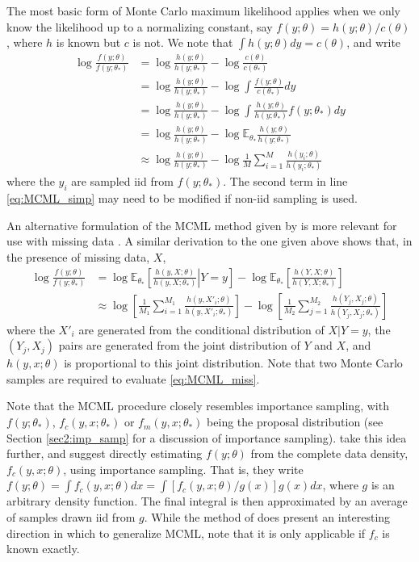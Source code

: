 \documentclass[11pt, oneside]{article}   	%
\newcommand{\bE}{\mathbb{E}}
\begin{document}
The most basic form of Monte Carlo maximum likelihood \citep{Gey91} applies when we only know the likelihood up to a normalizing constant, say $f(y; \theta) = h(y; \theta) / c(\theta)$, where $h$ is known but $c$ is not. We note that $\int h(y; \theta) dy = c(\theta)$, and write
%
\begin{align}
    \log \frac{f(y; \theta)}{f(y; \theta_*)} &= \log \frac{h(y; \theta)}{h(y; \theta_*)} - \log \frac{c(\theta)}{c(\theta_*)}\\
    &= \log \frac{h(y; \theta)}{h(y; \theta_*)} - \log \int \frac{f(y; \theta)}{c(\theta_*)} dy\\
    &= \log \frac{h(y; \theta)}{h(y; \theta_*)} - \log \int \frac{h(y; \theta)}{h(y; \theta_*)} f(y; \theta_*) dy\\
    &= \log \frac{h(y; \theta)}{h(y; \theta_*)} - \log \bE_{\theta_*} \frac{h(y; \theta)}{h(y; \theta_*)}\\
    & \approx \log \frac{h(y; \theta)}{h(y; \theta_*)} - \log \frac{1}{M} \sum_{i=1}^M \frac{h(y_i; \theta)}{h(y_i; \theta_*)} \label{eq:MCML_simp}
\end{align}
%
where the $y_i$ are sampled iid from $f(y; \theta_*)$. The second term in line \ref{eq:MCML_simp} may need to be modified if non-iid sampling is used.

An alternative formulation of the MCML method given by \citet{Gel93} is more relevant for use with missing data \citep[see also,][]{Gey94}. A similar derivation to the one given above shows that, in the presence of missing data, $X$,
%
\begin{align}
    \log \frac{f(y; \theta)}{f(y; \theta_*)} &= \log \bE_{\theta_*} \left[ \left. \frac{h(y, X; \theta)}{h(y, X; \theta_*)} \right| Y=y \right] - \log \bE_{\theta_*} \left[\frac{h(Y, X; \theta)}{h(Y, X; \theta_*)}\right]\\
    & \approx \log \left[\frac{1}{M_1} \sum_{i=1}^{M_1} \frac{h(y, X'_i; \theta)}{h(y, X'_i; \theta_*)}\right] - \log \left[\frac{1}{M_2} \sum_{j = 1}^{M_2} \frac{h(Y_j, X_j; \theta)}{h(Y_j, X_j; \theta_*)}\right] \label{eq:MCML_miss}
\end{align}
%
where the $X'_i$ are generated from the conditional distribution of $X|Y=y$, the $(Y_j, X_j)$ pairs are generated from the joint distribution of $Y$ and $X$, and $h(y, x; \theta)$ is proportional to this joint distribution. Note that two Monte Carlo samples are required to evaluate \ref{eq:MCML_miss}.

Note that the MCML procedure closely resembles importance sampling, with $f(y; \theta_*)$, $f_c(y, x; \theta_*)$ or $f_m(y, x; \theta_*)$ being the proposal distribution (see Section \ref{sec2:imp_samp} for a discussion of importance sampling). \citet{Jan03} take this idea further, and suggest directly estimating $f(y; \theta)$ from the complete data density, $f_c(y, x; \theta)$, using importance sampling. That is, they write $f(y; \theta) = \int f_c(y, x; \theta) dx = \int [ f_c(y, x; \theta) / g(x)] g(x) dx$, where $g$ is an arbitrary density function. The final integral is then approximated by an average of samples drawn iid from $g$. While the method of \citeauthor{Jan03} does present an interesting direction in which to generalize MCML, note that it is only applicable if $f_c$ is known exactly.
\end{document}
